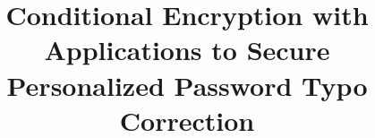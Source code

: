 \documentclass{article}
\begin{document}
	\title{Conditional Encryption with Applications to Secure Personalized Password Typo Correction}
	
	
	
	\maketitle
	
	
	
	
	
	
	
	
	
	
	
	
	
	
\end{document}
